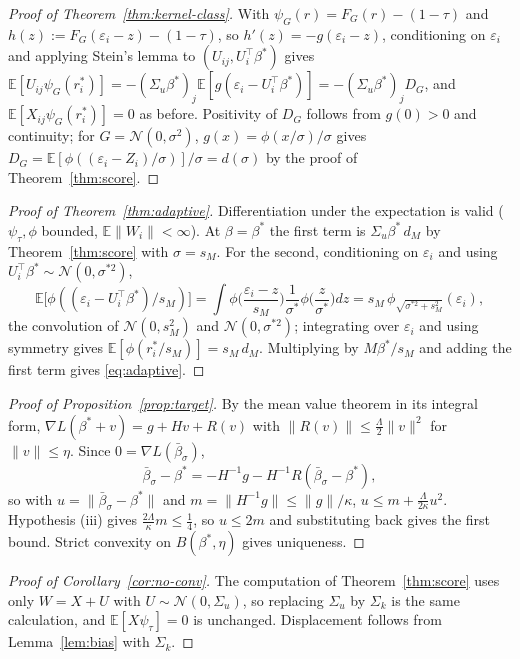 \documentclass[12pt,a4paper]{article}
\theoremstyle{definition}
\theoremstyle{remark}
\newcommand{\E}{\mathbb{E}}
\newcommand{\cN}{\mathcal{N}}
\newcommand{\psit}{\psi_\tau}
\newcommand{\betas}{\beta^*}
\newcommand{\bbar}{\bar{\beta}}
\begin{document}
\begin{proof}[Proof of Theorem~\ref{thm:kernel-class}]
With $\psi_G(r) = F_G(r)-(1-\tau)$ and $h(z) := F_G(\varepsilon_i-z)-(1-\tau)$, so
$h'(z) = -g(\varepsilon_i-z)$, conditioning on $\varepsilon_i$ and applying Stein's lemma
to $(U_{ij},U_i^\top\betas)$ gives
$\E[U_{ij}\psi_G(r_i^*)] = -(\Sigma_u\betas)_j\E[g(\varepsilon_i-U_i^\top\betas)]
= -(\Sigma_u\betas)_j D_G$, and $\E[X_{ij}\psi_G(r_i^*)]=0$ as before. Positivity of
$D_G$ follows from $g(0)>0$ and continuity; for $G=\cN(0,\sigma^2)$, $g(x)=\phi(x/\sigma)/\sigma$
gives $D_G = \E[\phi((\varepsilon_i-Z_i)/\sigma)]/\sigma = d(\sigma)$ by the proof of
Theorem~\ref{thm:score}.
\end{proof}

\begin{proof}[Proof of Theorem~\ref{thm:adaptive}]
Differentiation under the expectation is valid ($\psit,\phi$ bounded,
$\E\|W_i\|<\infty$). At $\beta=\betas$ the first term is
$\Sigma_u\betas\,d_M$ by Theorem~\ref{thm:score} with $\sigma=s_M$. For the second,
conditioning on $\varepsilon_i$ and using $U_i^\top\betas\sim\cN(0,\sigma^{*2})$,
\[
\E\big[\phi((\varepsilon_i-U_i^\top\betas)/s_M)\big]
= \int\phi\Big(\frac{\varepsilon_i-z}{s_M}\Big)\frac{1}{\sigma^*}\phi\Big(\frac{z}{\sigma^*}\Big)dz
= s_M\,\phi_{\sqrt{\sigma^{*2}+s_M^{2}}}(\varepsilon_i),
\]
the convolution of $\cN(0,s_M^{2})$ and $\cN(0,\sigma^{*2})$; integrating over
$\varepsilon_i$ and using symmetry gives $\E[\phi(r_i^*/s_M)] = s_M\,d_M$. Multiplying by
$M\betas/s_M$ and adding the first term gives \eqref{eq:adaptive}.
\end{proof}

\begin{proof}[Proof of Proposition~\ref{prop:target}]
By the mean value theorem in its integral form,
$\nabla L(\betas+v) = g+Hv+R(v)$ with
$\|R(v)\|\le\frac\Lambda2\|v\|^2$ for $\|v\|\le\eta$. Since $0=\nabla L(\bbar_\sigma)$,
\[
\bbar_\sigma-\betas = -H^{-1}g - H^{-1}R(\bbar_\sigma-\betas),
\]
so with $u = \|\bbar_\sigma-\betas\|$ and
$m=\|H^{-1}g\|\le\|g\|/\kappa$, $u \le m+\frac{\Lambda}{2\kappa}u^2$. Hypothesis (iii)
gives $\frac{2\Lambda}{\kappa}m\le\frac14$, so $u\le2m$ and substituting back gives the
first bound. Strict convexity on $B(\betas,\eta)$ gives uniqueness.
\end{proof}

\begin{proof}[Proof of Corollary~\ref{cor:no-conv}]
The computation of Theorem~\ref{thm:score} uses only $W = X+U$ with
$U\sim\cN(0,\Sigma_u)$, so replacing $\Sigma_u$ by $\Sigma_k$ is the same calculation, and
$\E[X\psit]=0$ is unchanged. Displacement follows from Lemma~\ref{lem:bias} with
$\Sigma_k$.
\end{proof}
\end{document}
